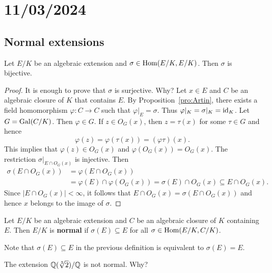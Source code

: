 \section{11/03/2024}


\subsection{Normal extensions}

\begin{proposition}
    Let $E/K$ be an algebraic extension and $\sigma\in\operatorname{Hom}(E/K,E/K)$. 
    Then $\sigma$ is bijective. 
\end{proposition}

\begin{proof}
    It is enough to prove that $\sigma$ is surjective. Why? 
    Let $x\in E$ and 
    $C$ be an algebraic closure of $K$ that contains $E$. By Proposition~\ref{pro:Artin}, there 
    exists a field homomorphism $\varphi\colon C\to C$ such that $\varphi|_E=\sigma$. 
    Thus $\varphi|_K=\sigma|_K=\operatorname{id}_K$. Let $G=\operatorname{Gal}(C/K)$. Then  
    $\varphi\in G$. If $z\in O_G(x)$, 
    then $z=\tau(x)$ for some $\tau\in G$ and hence
    \[
    \varphi(z)=\varphi(\tau(x))=(\varphi\tau)(x). 
    \]
    This implies that $\varphi(z)\in O_G(x)$ 
    and $\varphi(O_G(x))=O_G(x)$. The restriction
    $\sigma|_{E\cap O_G(x)}$ is injective. Then 
    \begin{align*}
        \sigma(E\cap O_G(x))&=\varphi(E\cap O_G(x))\\
        &=\varphi(E)\cap\varphi(O_G(x))
        =\sigma(E)\cap O_G(x)\subseteq E\cap O_G(x).
        \end{align*}
    Since $|E\cap O_G(x)|<\infty$, it follows that $E\cap O_G(x)=\sigma(E\cap O_G(x))$ and
    hence $x$ belongs to the image of $\sigma$. 
\end{proof}



\begin{definition}
    Let $E/K$ be an algebraic extension and $C$ be an algebraic closure of $K$ containing $E$. Then $E/K$ is \textbf{normal} if 
    $\sigma(E)\subseteq E$ for all $\sigma\in\operatorname{Hom}(E/K,C/K)$. 
\end{definition}

Note that $\sigma(E)\subseteq E$ in the previous definition
is equivalent to $\sigma(E)=E$. 

\begin{example}
    The extension $\mathbb{Q}(\sqrt[3]{2})/\mathbb{Q}$ is not normal. Why?
\end{example}

